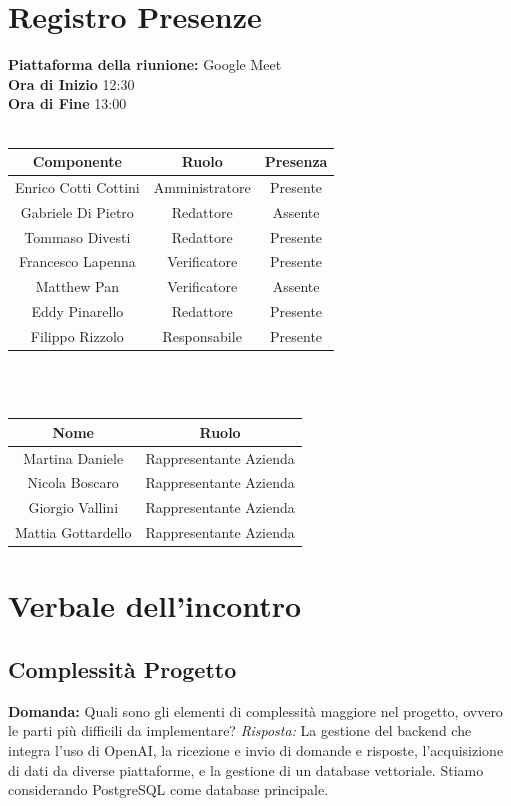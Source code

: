 \documentclass{article}
\begin{document}
\section{Registro Presenze}
\textbf{Piattaforma della riunione:} Google Meet \\
\textbf{Ora di Inizio} 12:30\\
\textbf{Ora di Fine} 13:00\\
\\
\begin{tabular}{|c|c|c|}
    \hline
    \textbf{Componente} & \textbf{Ruolo} & \textbf{Presenza}\\
    \hline
    Enrico Cotti Cottini & Amministratore & Presente \\ 
    \hline
    Gabriele Di Pietro & Redattore & Assente \\ 
    \hline
    Tommaso Divesti & Redattore & Presente \\ 
    \hline 
    Francesco Lapenna & Verificatore & Presente \\ 
    \hline
    Matthew Pan & Verificatore & Assente \\ 
    \hline 
    Eddy Pinarello & Redattore & Presente \\ 
    \hline 
    Filippo Rizzolo & Responsabile & Presente \\ 
    \hline 
\end{tabular}
\\
\newline
\\
\begin{tabular}{|c|c|}
    \hline
    \textbf{Nome} & \textbf{Ruolo}\\
    \hline
    Martina Daniele & Rappresentante Azienda\\
    Nicola Boscaro & Rappresentante Azienda\\
    Giorgio Vallini & Rappresentante Azienda\\
    Mattia Gottardello & Rappresentante Azienda\\
    \hline
\end{tabular}
\newpage

\section{Verbale dell'incontro}

\subsection{Complessità Progetto} \textbf{Domanda:} Quali sono gli elementi di complessità maggiore nel progetto, ovvero le parti più difficili da implementare?
\newline
\textit{Risposta:} La gestione del backend che integra l'uso di OpenAI, la ricezione e invio di domande e risposte, l'acquisizione di dati da diverse piattaforme, e la gestione di un database vettoriale. Stiamo considerando PostgreSQL come database principale.
\end{document}
